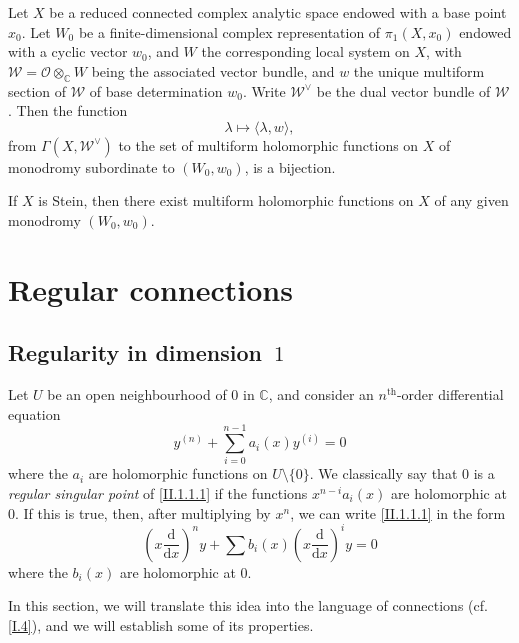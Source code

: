 \documentclass{report}
\theoremstyle{plain}
\newenvironment{corollary}[1]
    {\renewcommand\theinnercustomcorollary{#1}\innercustomcorollary}
    {\endinnercustomcorollary}
\theoremstyle{definition}
\newenvironment{env}[1]
    {\renewcommand\theinnercustomenv{#1}\innercustomenv}
    {\endinnercustomenv}
\newcommand{\sh}[1]{{\mathscr{#1}}}
\newcommand{\CC}{\mathbb{C}}
\newcommand{\dd}{\mathrm{d}}
\newcommand{\oldpage}[1]{\marginpar{\footnotesize$\Big\vert$ \textit{p.~#1}}}
\begin{document}
\begin{corollary}{6.11}
\label{I.6.11}
  Let $X$ be a reduced connected complex analytic space endowed with a base point $x_0$.
  Let $W_0$ be a finite-dimensional complex representation of $\pi_1(X,x_0)$ endowed with a cyclic vector $w_0$, and $W$ the corresponding local system on $X$, with $\sh{W}=\sh{O}\otimes_\CC W$ being
\oldpage{40}
  the associated vector bundle, and $w$ the unique multiform section of $\sh{W}$ of base determination $w_0$.
  Write $\sh{W}^\vee$ be the dual vector bundle of $\sh{W}$.
  Then the function
  \[
    \lambda \mapsto \langle\lambda,w\rangle,
  \]
  from $\Gamma(X,\sh{W}^\vee)$ to the set of multiform holomorphic functions on $X$ of monodromy subordinate to $(W_0,w_0)$, is a bijection.
\end{corollary}

\begin{corollary}{6.12}
\label{I.6.12}
  If $X$ is Stein, then there exist multiform holomorphic functions on $X$ of any given monodromy $(W_0,w_0)$.
\end{corollary}



\chapter{Regular connections}
\label{II}


\section{Regularity in dimension~\texorpdfstring{$1$}{1}}
\label{II.1}

\oldpage{41}
\begin{env}{1.1}
\label{II.1.1}
  Let $U$ be an open neighbourhood of $0$ in $\CC$, and consider an $n^\mathrm{th}$-order differential equation
  \[
  \label{II.1.1.1}
    y^{(n)} + \sum_{i=0}^{n-1} a_i(x) y^{(i)} = 0
  \tag{1.1.1}
  \]
  where the $a_i$ are holomorphic functions on $U\setminus\{0\}$.
  We classically say that $0$ is a \emph{regular singular point} of \cref{II.1.1.1} if the functions $x^{n-i}a_i(x)$ are holomorphic at $0$.
  If this is true, then, after multiplying by $x^n$, we can write \cref{II.1.1.1} in the form
  \[
  \label{II.1.1.2}
    \left(x\frac{\dd}{\dd x}\right)^n y
    + \sum b_i(x)\left(x\frac{\dd}{\dd x}\right)^i y
    = 0
  \tag{1.1.2}
  \]
  where the $b_i(x)$ are holomorphic at $0$.
\end{env}

In this section, we will translate this idea into the language of connections (cf. \cref{I.4}), and we will establish some of its properties.
\end{document}
